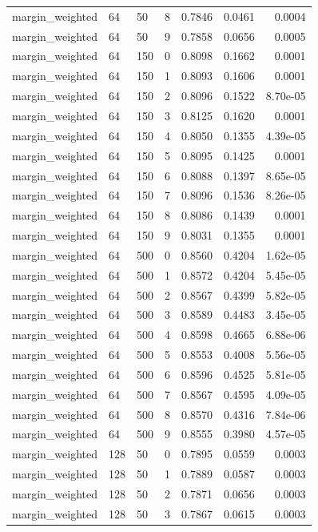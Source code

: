 \begin{footnotesize}
\begin{longtable}{lllrrrr}
margin\_weighted & 64 & 50 & 8 & 0.7846 & 0.0461 & 0.0004 \\
margin\_weighted & 64 & 50 & 9 & 0.7858 & 0.0656 & 0.0005 \\
margin\_weighted & 64 & 150 & 0 & 0.8098 & 0.1662 & 0.0001 \\
margin\_weighted & 64 & 150 & 1 & 0.8093 & 0.1606 & 0.0001 \\
margin\_weighted & 64 & 150 & 2 & 0.8096 & 0.1522 & 8.70e-05 \\
margin\_weighted & 64 & 150 & 3 & 0.8125 & 0.1620 & 0.0001 \\
margin\_weighted & 64 & 150 & 4 & 0.8050 & 0.1355 & 4.39e-05 \\
margin\_weighted & 64 & 150 & 5 & 0.8095 & 0.1425 & 0.0001 \\
margin\_weighted & 64 & 150 & 6 & 0.8088 & 0.1397 & 8.65e-05 \\
margin\_weighted & 64 & 150 & 7 & 0.8096 & 0.1536 & 8.26e-05 \\
margin\_weighted & 64 & 150 & 8 & 0.8086 & 0.1439 & 0.0001 \\
margin\_weighted & 64 & 150 & 9 & 0.8031 & 0.1355 & 0.0001 \\
margin\_weighted & 64 & 500 & 0 & 0.8560 & 0.4204 & 1.62e-05 \\
margin\_weighted & 64 & 500 & 1 & 0.8572 & 0.4204 & 5.45e-05 \\
margin\_weighted & 64 & 500 & 2 & 0.8567 & 0.4399 & 5.82e-05 \\
margin\_weighted & 64 & 500 & 3 & 0.8589 & 0.4483 & 3.45e-05 \\
margin\_weighted & 64 & 500 & 4 & 0.8598 & 0.4665 & 6.88e-06 \\
margin\_weighted & 64 & 500 & 5 & 0.8553 & 0.4008 & 5.56e-05 \\
margin\_weighted & 64 & 500 & 6 & 0.8596 & 0.4525 & 5.81e-05 \\
margin\_weighted & 64 & 500 & 7 & 0.8567 & 0.4595 & 4.09e-05 \\
margin\_weighted & 64 & 500 & 8 & 0.8570 & 0.4316 & 7.84e-06 \\
margin\_weighted & 64 & 500 & 9 & 0.8555 & 0.3980 & 4.57e-05 \\
margin\_weighted & 128 & 50 & 0 & 0.7895 & 0.0559 & 0.0003 \\
margin\_weighted & 128 & 50 & 1 & 0.7889 & 0.0587 & 0.0003 \\
margin\_weighted & 128 & 50 & 2 & 0.7871 & 0.0656 & 0.0003 \\
margin\_weighted & 128 & 50 & 3 & 0.7867 & 0.0615 & 0.0003 \\

\end{longtable}
\end{footnotesize}
